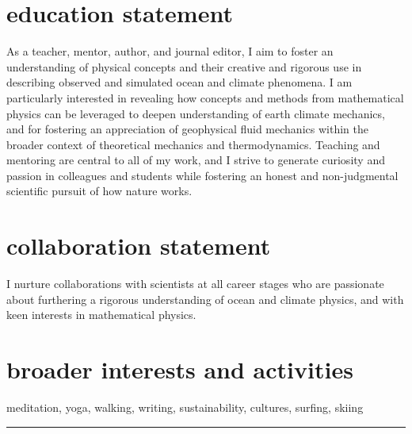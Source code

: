 \documentclass{article}
\begin{document}
\vspace{-.5cm}
\section*{\sc \color{Maroon} education statement}
\vspace{-.3cm}
As a teacher, mentor, author, and journal editor, I aim to foster an understanding of physical concepts and their creative and rigorous use in describing observed and simulated ocean and climate phenomena. I am particularly interested in revealing how concepts and methods from mathematical physics can be leveraged to deepen understanding of earth climate mechanics, and for fostering an appreciation of geophysical fluid mechanics within the broader context of theoretical mechanics and thermodynamics. Teaching and mentoring are central to all of my work, and I strive to generate curiosity and passion in colleagues and students while fostering an honest and non-judgmental scientific pursuit of how nature works. 

\vspace{-.5cm}
\section*{\sc  \color{Maroon}  collaboration statement}
\vspace{-.3cm}
I nurture collaborations with scientists at all career stages who are passionate about furthering a rigorous understanding of ocean and climate physics, and with keen interests in mathematical physics. 

\vspace{-.5cm}
\section*{\sc  \color{Maroon}  broader interests and activities}
\vspace{-.3cm}
meditation, yoga, walking, writing, sustainability, cultures, surfing, skiing

\noindent\rule{\textwidth}{1pt}


\vspace{-.2cm}
\end{document}
